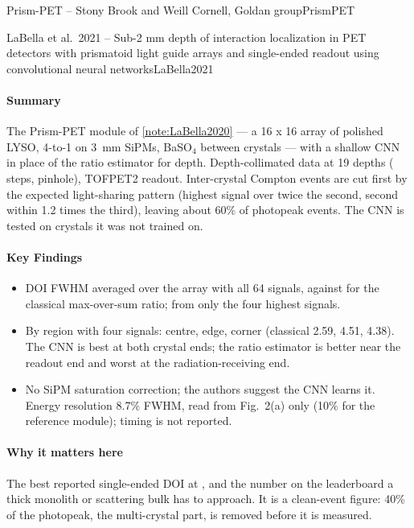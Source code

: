 \begin{programnote}{Prism-PET -- Stony Brook and Weill Cornell, Goldan group}{PrismPET}
\begin{papernote}{LaBella et al.\ 2021 -- Sub-2 mm depth of interaction localization in PET detectors with prismatoid light guide arrays and single-ended readout using convolutional neural networks}{LaBella2021}
\paragraph{Summary}
The Prism-PET module of \ref{note:LaBella2020} --- a 16 x 16 array of
 polished LYSO, 4-to-1 on 3~mm SiPMs, BaSO$_4$
between crystals --- with a shallow CNN in place of the ratio estimator for
depth. Depth-collimated data at 19 depths ( steps,  pinhole),
TOFPET2 readout. Inter-crystal Compton events are cut first by the expected
light-sharing pattern (highest signal over twice the second, second within 1.2
times the third), leaving about 60\% of photopeak events. The CNN is tested on
crystals it was not trained on.

\paragraph{Key Findings}
\begin{itemize}
	\item DOI  FWHM averaged over the array with all 64 signals, against
		 for the classical max-over-sum ratio;  from only the
		four highest signals.
	\item By region with four signals:  centre,  edge,
		 corner (classical 2.59, 4.51, 4.38). The CNN is best at both
		crystal ends; the ratio estimator is better near the readout
		end and worst at the radiation-receiving end.
	\item No SiPM saturation correction; the authors suggest the CNN learns it.
		Energy resolution 8.7\% FWHM, read from Fig.\ 2(a) only (10\% for the
		reference module); timing is not reported.
\end{itemize}

\paragraph{Why it matters here}
The best reported single-ended DOI at , and the number on the
leaderboard a thick monolith or scattering bulk has to approach. It is a
clean-event figure: 40\% of the photopeak, the multi-crystal part, is removed
before it is measured.


\end{papernote}
\end{programnote}
